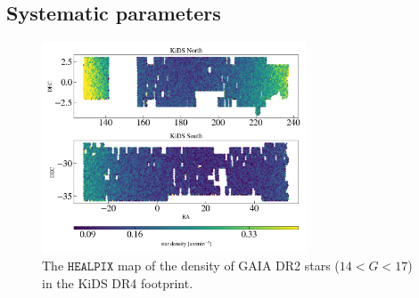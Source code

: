 \documentclass{aa}
\numberwithin{equation}{section}
\begin{document}
{\subsection{Systematic parameters}

\begin{figure}
\centering
\includegraphics[width=0.7\textwidth, height = 0.5\textwidth]{figures_tmp/sys/scatter_nstar.png}
\caption{ The $\mathtt{HEALPIX}$ map of the density of GAIA DR2 stars ($14<G<17$) in the KiDS DR4 footprint.} 
\label{fig:scatter_stardens}
\end{figure}

}
\end{document}
